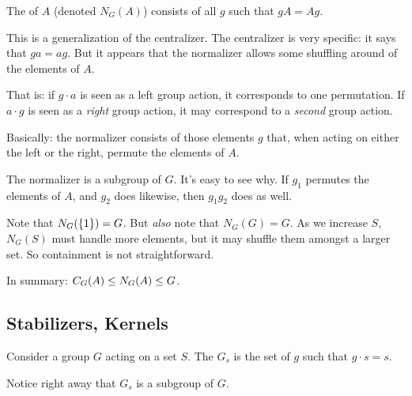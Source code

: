 \documentclass[11pt, oneside]{amsart}
\begin{document}
\begin{definition}
  The  of $A$ (denoted $N_G(A)$) consists of all $g$
  such that $gA = Ag$.
\end{definition}

\begin{remark}
  This is a generalization of the centralizer. The centralizer is very
  specific: it says that $ga = ag$. But it appears that the normalizer
  allows some shuffling around of the elements of $A$.

  That is: if $g \cdot a$ is seen as a left group action, it corresponds
  to one permutation. If $a \cdot g$ is seen as a \emph{right} group
  action, it may correspond to a \emph{second} group action.

  Basically: the normalizer consists of those elements $g$ that, when
  acting on either the left or the right, permute the elements of $A$.
\end{remark}

\begin{remark}
  The normalizer is a subgroup of $G$. It's easy to see why. If $g_1$
  permutes the elements of $A$, and $g_2$ does likewise, then $g_1 g_2$
  does as well.
\end{remark}

\begin{remark}
  Note that $N_G(\left\{ 1 \right\}) = G$. But \emph{also} note that $N_G(G) =
  G$. As we increase $S$, $N_G(S)$ must handle more elements, but it may
  shuffle them amongst a larger set. So containment is not
  straightforward.
\end{remark}

\begin{remark}
  In summary: $C_G(A) \leq N_G(A) \leq G$.
\end{remark}

\subsection{Stabilizers, Kernels}

\begin{definition}
  Consider a group $G$ acting on a set $S$. The 
  $G_s$ is the set of $g$ such that $g \cdot s = s$.
\end{definition}

\begin{remark}
  Notice right away that $G_s$ is a subgroup of $G$.
\end{remark}
\end{document}
